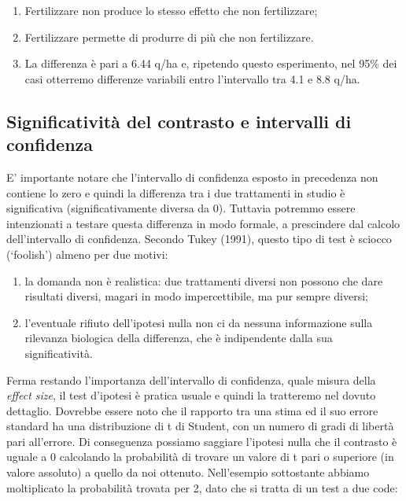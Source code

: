 \documentclass[a4paper,12pt,oneside]{book}
\providecommand{\tightlist}{%
  \setlength{\itemsep}{0pt}\setlength{\parskip}{0pt}}
\theoremstyle{definition}
\theoremstyle{definition}
\theoremstyle{definition}
\theoremstyle{remark}
\begin{document}
\begin{enumerate}
\def\labelenumi{\arabic{enumi}.}
\tightlist
\item
  Fertilizzare non produce lo stesso effetto che non fertilizzare;
\item
  Fertilizzare permette di produrre di più che non fertilizzare.
\item
  La differenza è pari a 6.44 q/ha e, ripetendo questo esperimento, nel
  95\% dei casi otterremo differenze variabili entro l'intervallo tra
  4.1 e 8.8 q/ha.
\end{enumerate}

\subsection{Significatività del contrasto e intervalli di
confidenza}\label{significativita-del-contrasto-e-intervalli-di-confidenza}

E' importante notare che l'intervallo di confidenza esposto in
precedenza non contiene lo zero e quindi la differenza tra i due
trattamenti in studio è significativa (significativamente diversa da 0).
Tuttavia potremmo essere intenzionati a testare questa differenza in
modo formale, a prescindere dal calcolo dell'intervallo di confidenza.
Secondo Tukey (1991), questo tipo di test è sciocco (`foolish') almeno
per due motivi:

\begin{enumerate}
\def\labelenumi{\arabic{enumi}.}
\tightlist
\item
  la domanda non è realistica: due trattamenti diversi non possono che
  dare risultati diversi, magari in modo impercettibile, ma pur sempre
  diversi;
\item
  l'eventuale rifiuto dell'ipotesi nulla non ci da nessuna informazione
  sulla rilevanza biologica della differenza, che è indipendente dalla
  sua significatività.
\end{enumerate}

Ferma restando l'importanza dell'intervallo di confidenza, quale misura
della \emph{effect size}, il test d'ipotesi è pratica usuale e quindi la
tratteremo nel dovuto dettaglio. Dovrebbe essere noto che il rapporto
tra una stima ed il suo errore standard ha una distribuzione di t di
Student, con un numero di gradi di libertà pari all'errore. Di
conseguenza possiamo saggiare l'ipotesi nulla che il contrasto è uguale
a 0 calcolando la probabilità di trovare un valore di t pari o superiore
(in valore assoluto) a quello da noi ottenuto. Nell'esempio sottostante
abbiamo moltiplicato la probabilità trovata per 2, dato che si tratta di
un test a due code:
\end{document}
